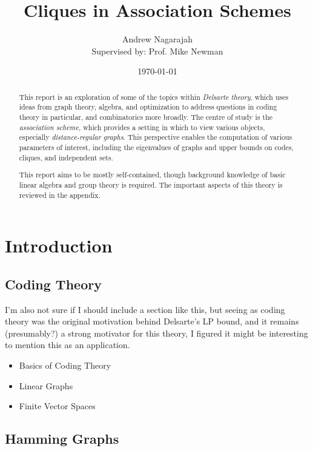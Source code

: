 \documentclass{report}
\title{Cliques in Association Schemes}
\author{
  Andrew Nagarajah \\
  Supervised by: Prof. Mike Newman
}
\date{\today}
\begin{document}
\maketitle

\begin{abstract}

  This report is an exploration of some of the topics within \emph{Delsarte
  theory}, which uses ideas from graph theory, algebra, and optimization to
  address questions in coding theory in particular, and combinatorics more
  broadly.  The centre of study is the \emph{association scheme}, which provides
  a setting in which to view various objects, especially \emph{distance-regular
  graphs}.  This perspective enables the computation of various parameters of
  interest, including the eigenvalues of graphs and upper bounds on codes,
  cliques, and independent sets.

  This report aims to be mostly self-contained, though background knowledge of
  basic linear algebra and group theory is required.  The important aspects of
  this theory is reviewed in the appendix.

\end{abstract}

\tableofcontents

\chapter{Introduction}
  \section{Coding Theory}
    I'm also not sure if I should include a section like this, but seeing as
    coding theory was the original motivation behind Delsarte's LP bound,
    and it remains (presumably?) a strong motivator for this theory,
    I figured it might be interesting to mention this as an application.

    \begin{itemize}
      \item Basics of Coding Theory
      \item Linear Graphs
      \item Finite Vector Spaces
    \end{itemize}

  \section{Hamming Graphs}
\end{document}
